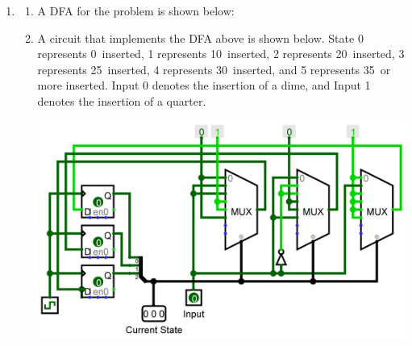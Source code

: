 \documentclass[11pt, notitlepage, leqno]{article}
\begin{document}
\begin{enumerate}
\begin{proof}
The third student, then, must have talked to at least three students by the same logic as above, and this pattern continues on until the $N$th student is reached. Based on the established intuition, it is expected that the $N$th student talked to at least $N$ other students. However, given that students do not talk to themselves, this is impossible, because the maximum number of students that a student can talk to is $N-1$ (everyone but him/herself). Our original assumption thus leads to a contradiction, and therefore it must be true that if every student has talked to at least one other student, then two of the students talked to exactly the same number of people.
\end{proof}

\item \begin{enumerate}

\item A DFA for the problem is shown below:


\item A circuit that implements the DFA above is shown below. State 0 represents 0\textcent\ inserted, 1 represents 10\textcent\ inserted, 2 represents 20\textcent\ inserted, 3 represents 25\textcent\ inserted, 4 represents 30\textcent\ inserted, and 5 represents 35\textcent\ or more inserted. Input 0 denotes the insertion of a dime, and Input 1 denotes the insertion of a quarter.
\begin{center}
\includegraphics[scale=0.096]{Circuit}
\end{center}


\end{enumerate}
\end{enumerate}
\end{document}
